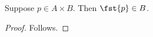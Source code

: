 

\begin{classification}\label{notion_first_projection_wrong_endpoint}
    Suppose $p\in A\times B$.
    Then $\fst{p}\in B$.
\end{classification}
\begin{proof}
    Follows.
\end{proof}
